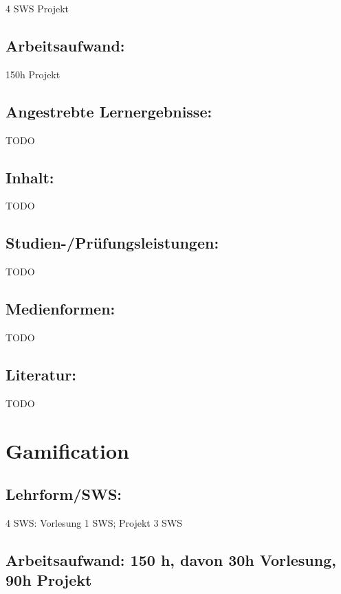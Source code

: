 4 SWS Projekt

\section{Arbeitsaufwand:}\label{arbeitsaufwand-22}

150h Projekt

\section{Angestrebte
Lernergebnisse:}\label{angestrebte-lernergebnisse-22}

TODO

\section{Inhalt:}\label{inhalt-22}

TODO

\section{Studien-/Prüfungsleistungen:}\label{studien-pruxfcfungsleistungen-22}

TODO

\section{Medienformen:}\label{medienformen-22}

TODO

\section{Literatur:}\label{literatur-22}

TODO

\chapter{Gamification}\label{gamification}

\section{Lehrform/SWS:}\label{lehrformsws-23}

4 SWS: Vorlesung 1 SWS; Projekt 3 SWS

\section{Arbeitsaufwand: 150 h, davon 30h Vorlesung, 90h
Projekt}\label{arbeitsaufwand-150-h-davon-30h-vorlesung-90h-projekt}

